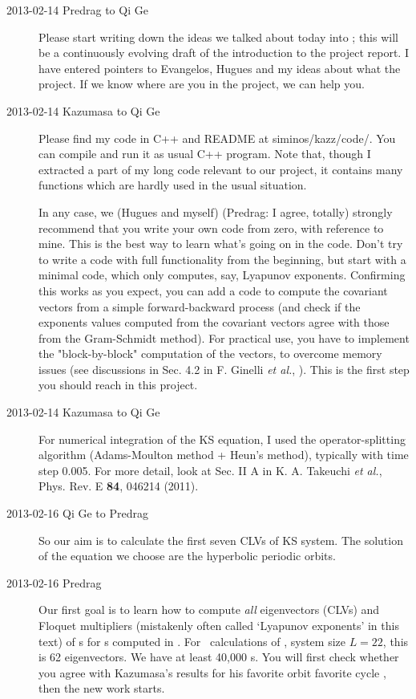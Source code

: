 \begin{description}
\item[2013-02-14 Predrag to Qi Ge] Please start writing down the
ideas we talked about today into ; this will
be a continuously evolving draft of the introduction to the project
report. I have entered pointers to Evangelos, Hugues and my ideas
about what the project. If we know where are you in the project, we can
help you.

\item[2013-02-14 Kazumasa to Qi Ge]
Please find my code in C++ and README at siminos/kazz/code/.
You can compile and run it as usual C++ program.
Note that, though I extracted a part of my long code relevant to our project,
 it contains many functions which are hardly used in the usual situation.

In any case, we (Hugues and myself) (Predrag: I agree, totally)
strongly recommend that you write your own code from zero, with
reference to mine. This is the best way to learn what's going on in
the code. Don't try to write a code with full functionality from the
beginning, but start with a minimal code, which only computes, say,
Lyapunov exponents.
Confirming this works as you expect, you can add a code to compute
the covariant vectors from a simple forward-backward process (and
check if the exponents values computed from the covariant vectors
agree with those from the Gram-Schmidt method). For practical use,
you have to implement the "block-by-block" computation of the
vectors, to overcome memory issues (see discussions in Sec. 4.2 in F.
Ginelli \textit{et al.}, ). This is
the first step you should reach in this project.

\item[2013-02-14 Kazumasa to Qi Ge]
For numerical integration of the KS equation, I used the
operator-splitting algorithm (Adams-Moulton method + Heun's method),
typically with time step 0.005.
For more detail, look at Sec. II A in K. A. Takeuchi \textit{et al.},
 Phys. Rev. E \textbf{84}, 046214 (2011).

\item[2013-02-16 Qi Ge to Predrag] So our aim is to calculate the
first seven CLVs of KS system. The solution of the equation we choose
are the hyperbolic periodic orbits.

\item[2013-02-16 Predrag] Our first goal is to learn
how to compute \emph{all} eigenvectors (CLVs) and Floquet multipliers
(mistakenly often called `Lyapunov exponents' in this text) of
\JacobianM s for \po s computed in . For \KS\
calculations of , system size $L=22$, this is 62
eigenvectors. We have at least 40,000 \rpo s. You will first check
whether you agree with Kazumasa's results for his favorite orbit
favorite cycle \PO{10.25}, then the new work starts.


\end{description}
